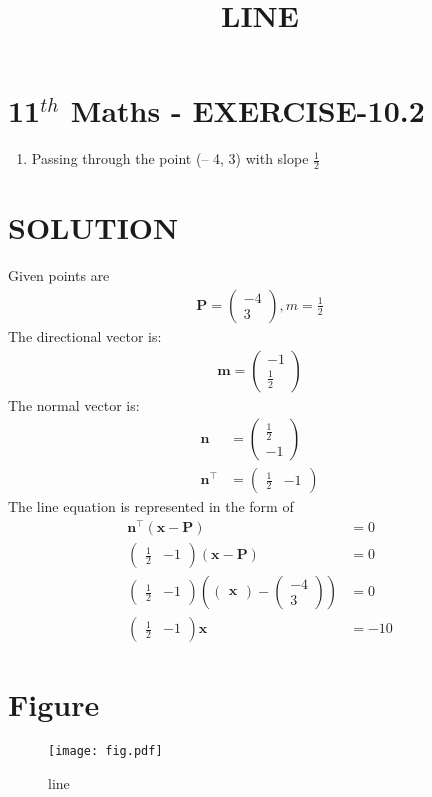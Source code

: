 \documentclass[12pt]{article}
\providecommand{\brak}[1]{\ensuremath{\left(#1\right)}}
\newcommand{\myvec}[1]{\ensuremath{\begin{pmatrix}#1\end{pmatrix}}}
\let\vec\mathbf
\begin{document}
\begin{center}
\title{\textbf{LINE}}
\date{\vspace{-5ex}} %
\maketitle
\end{center}

\section{11$^{th}$ Maths - EXERCISE-10.2}
\begin{enumerate}
\item Passing through the point (– 4, 3) with slope $\frac{1}{2}$
\end{enumerate}
\section{SOLUTION}
Given points are 
\begin{align}
\vec{P}=\myvec{-4\\ 3},
m=\frac{1}{2}
\end{align}
The directional vector is:
\begin{align}
\vec{m}=\myvec{-1\\ \frac{1}{2}}
\end{align}
The normal vector is:
\begin{align}
\vec{n}&=\myvec{\frac{1}{2}\\ -1}\\
	\vec{n}^\top&=\myvec{\frac{1}{2}& -1}	
\end{align}
The line equation is represented in the form of 
\begin{align}
\vec{n}^\top \brak{\vec{x}-\vec{P}}&= 0 \\
\myvec{\frac{1}{2}& -1}\brak{\vec{x}-\vec{P}}&=0\\ 
\myvec{\frac{1}{2}& -1}\brak{\myvec{\vec{x}}-\myvec{-4\\3}}&=0\\   
\myvec{\frac{1}{2}& -1}{\vec{x}}&=-10
\end{align}
\section{Figure}
\begin{figure}[h]
\centering
\texttt{[image: fig.pdf]}
\caption{line}
		\label{fig:Figure}
\end{figure}
\end{document}
